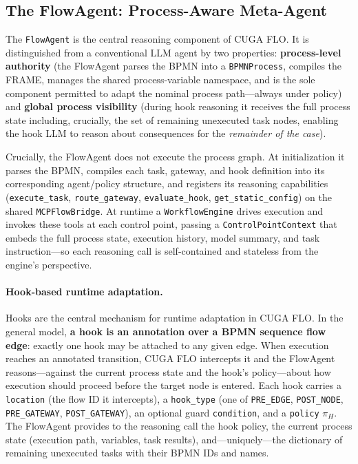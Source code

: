 \documentclass[11pt,a4paper]{article}
\begin{document}
\subsection{The FlowAgent: Process-Aware Meta-Agent}

The \texttt{FlowAgent} is the central reasoning component of CUGA FLO. It is
distinguished from a conventional LLM agent by two properties: \textbf{process-level
authority} (the FlowAgent parses the BPMN into a \texttt{BPMNProcess}, compiles the
FRAME, manages the shared process-variable namespace, and is the sole component
permitted to adapt the nominal process path---always under policy) and
\textbf{global process visibility} (during hook reasoning it receives the full
process state including, crucially, the set of remaining unexecuted task nodes,
enabling the hook LLM to reason about consequences for the \emph{remainder of the
case}).

Crucially, the FlowAgent does not execute the process graph. At initialization it
parses the BPMN, compiles each task, gateway, and hook definition into its
corresponding agent/policy structure, and registers its reasoning capabilities
(\texttt{execute\_task}, \texttt{route\_gateway}, \texttt{evaluate\_hook},
\texttt{get\_static\_config}) on the shared \texttt{MCPFlowBridge}. At runtime a
\texttt{WorkflowEngine} drives execution and invokes these tools at each control
point, passing a \texttt{ControlPointContext} that embeds the full process state,
execution history, model summary, and task instruction---so each reasoning call is
self-contained and stateless from the engine's perspective.

\paragraph{Hook-based runtime adaptation.}
Hooks are the central mechanism for runtime adaptation in CUGA FLO. In the general
model, \textbf{a hook is an annotation over a BPMN sequence flow edge}: exactly one
hook may be attached to any given edge. When execution reaches an annotated
transition, CUGA FLO intercepts it and the FlowAgent reasons---against the current
process state and the hook's policy---about how execution should proceed before the
target node is entered. Each hook carries a \texttt{location} (the flow ID it
intercepts), a \texttt{hook\_type} (one of \texttt{PRE\_EDGE}, \texttt{POST\_NODE},
\texttt{PRE\_GATEWAY}, \texttt{POST\_GATEWAY}), an optional guard \texttt{condition},
and a \texttt{policy} $\pi_H$. The FlowAgent provides to the reasoning call the
hook policy, the current process state (execution path, variables, task results),
and---uniquely---the dictionary of remaining unexecuted tasks with their BPMN IDs
and names.
\end{document}
